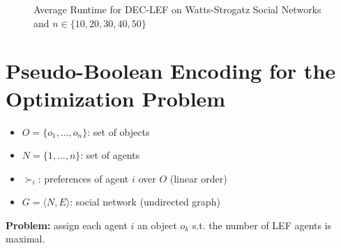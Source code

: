 \documentclass{article}
\begin{document}
\begin{figure}[htb]
\centering
{}

\caption{Average Runtime for DEC-LEF on Watts-Strogatz Social Networks and $n \in \{10,20,30,40,50\}$\label{fig:runtime-watts-strogatz}}
\end{figure}

\section{Pseudo-Boolean Encoding for the Optimization Problem}
\begin{itemize}
	\item $O = \{o_1, \dots, o_n\}$: set of objects
	\item $N = \{1,\dots,n\}$: set of agents
	\item $\succ_i$: preferences of agent $i$ over $O$ (linear order)
	\item $G = \langle N, E\rangle$: social network (undirected graph)
\end{itemize}
{\bf Problem:} assign each agent $i$ an object $o_k$ s.t. the number of LEF agents is maximal.
\end{document}
